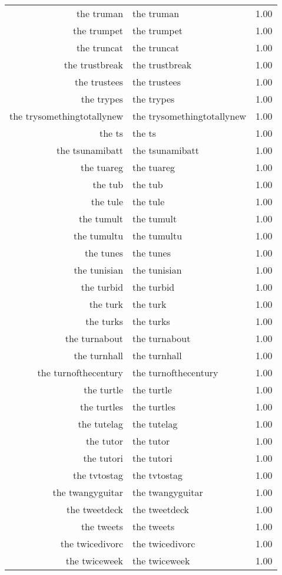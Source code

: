 \begin{table}[ht]
\begin{tabular}{rlr}
  the truman & the truman & 1.00 \\ 
  the trumpet & the trumpet & 1.00 \\ 
  the truncat & the truncat & 1.00 \\ 
  the trustbreak & the trustbreak & 1.00 \\ 
  the trustees & the trustees & 1.00 \\ 
  the trypes & the trypes & 1.00 \\ 
  the trysomethingtotallynew & the trysomethingtotallynew & 1.00 \\ 
  the ts & the ts & 1.00 \\ 
  the tsunamibatt & the tsunamibatt & 1.00 \\ 
  the tuareg & the tuareg & 1.00 \\ 
  the tub & the tub & 1.00 \\ 
  the tule & the tule & 1.00 \\ 
  the tumult & the tumult & 1.00 \\ 
  the tumultu & the tumultu & 1.00 \\ 
  the tunes & the tunes & 1.00 \\ 
  the tunisian & the tunisian & 1.00 \\ 
  the turbid & the turbid & 1.00 \\ 
  the turk & the turk & 1.00 \\ 
  the turks & the turks & 1.00 \\ 
  the turnabout & the turnabout & 1.00 \\ 
  the turnhall & the turnhall & 1.00 \\ 
  the turnofthecentury & the turnofthecentury & 1.00 \\ 
  the turtle & the turtle & 1.00 \\ 
  the turtles & the turtles & 1.00 \\ 
  the tutelag & the tutelag & 1.00 \\ 
  the tutor & the tutor & 1.00 \\ 
  the tutori & the tutori & 1.00 \\ 
  the tvtostag & the tvtostag & 1.00 \\ 
  the twangyguitar & the twangyguitar & 1.00 \\ 
  the tweetdeck & the tweetdeck & 1.00 \\ 
  the tweets & the tweets & 1.00 \\ 
  the twicedivorc & the twicedivorc & 1.00 \\ 
  the twiceweek & the twiceweek & 1.00 \\ 

\end{tabular}
\end{table}
